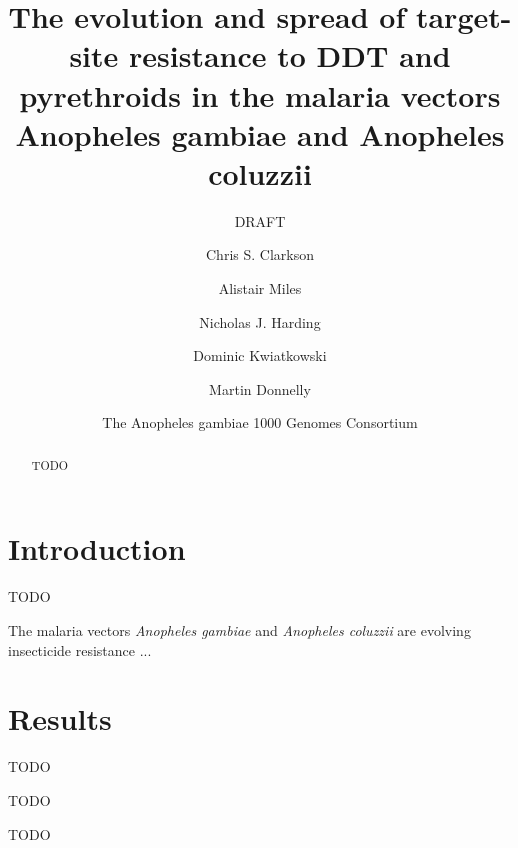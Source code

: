 \documentclass[a4paper,11pt,abstracton]{scrartcl}
\title{The evolution and spread of target-site resistance to DDT and 
pyrethroids in the malaria vectors Anopheles gambiae and Anopheles coluzzii}
\subtitle{DRAFT}
\author{
	Chris S. Clarkson
	\and 
	Alistair Miles
	\and
	Nicholas J. Harding
	\and
	Dominic Kwiatkowski
	\and
	Martin Donnelly
	\and
	The Anopheles gambiae 1000 Genomes Consortium
}
\begin{document}
\maketitle

\begin{abstract}

TODO

\end{abstract}

\section{Introduction}

TODO

The malaria vectors \emph{Anopheles gambiae} and \emph{Anopheles coluzzii} are 
evolving insecticide resistance ...

\section{Results}

TODO



TODO


TODO
\end{document}
